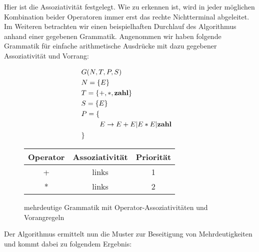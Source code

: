 \documentclass[runningheads]{llncs}
\begin{document}
    Hier ist die Assoziativität festgelegt.
    Wie zu erkennen ist, wird in jeder möglichen Kombination beider Operatoren immer erst das rechte Nichtterminal abgeleitet.
    Im Weiteren betrachten wir einen beispielhaften Durchlauf des Algorithmus anhand einer gegebenen Grammatik.
    Angenommen wir haben folgende Grammatik für einfache arithmetische Ausdrücke mit dazu gegebener Assoziativität und Vorrang:

    \begin{figure}
        \begin{minipage}{0.48\textwidth}
            \begin{flushleft}
                \begin{align*}
                    & G(N,T,P,S) \\
                    & N = \{E\} \\
                    & T = \{+, *, \bold{zahl}\} \\
                    & S = \{E\} \\
                    & P = \{ \begin{aligned}[t]
                                 \\ E & \rightarrow E + E | E * E | \bold{zahl}
                    \end{aligned} \\
                    & \}
                \end{align*}
            \end{flushleft}
        \end{minipage}
        \hfill
        \begin{minipage}{0.48\textwidth}
            \begin{tabular}{|c|c|c|}
                \hline
                Operator & Assoziativität & Priorität \\
                \hline
                +        & links          & 1         \\
                *        & links          & 2         \\
                \hline
            \end{tabular}
        \end{minipage}
        \caption{mehrdeutige Grammatik mit Operator-Assoziativitäten und Vorangregeln}
        \label{fig:figure7}
    \end{figure}

    Der Algorithmus ermittelt nun die Muster zur Beseitigung von Mehrdeutigkeiten und kommt dabei zu folgendem Ergebnis:
\end{document}
